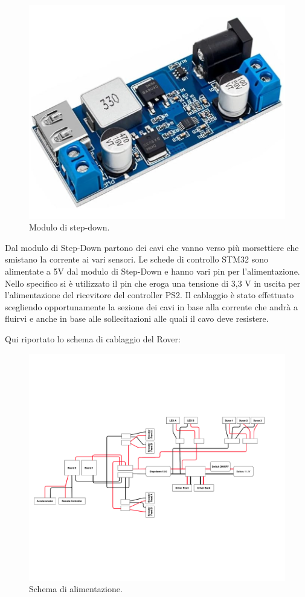 \documentclass{article}
\begin{document}
\begin{figure}[H]
\centering
\includegraphics[width=0.6\linewidth]{image/step-down.png}
\caption{\label{fig:step-down}Modulo di step-down.}
\end{figure}
Dal modulo di Step-Down partono dei cavi che vanno verso più morsettiere che smistano la corrente ai vari sensori.
Le schede di controllo STM32 sono alimentate a 5V dal modulo di Step-Down e hanno vari pin per l'alimentazione. Nello specifico si è utilizzato il pin che eroga una tensione di 3,3 V in uscita  per l'alimentazione del ricevitore del controller PS2.
Il cablaggio è stato effettuato scegliendo opportunamente la sezione dei cavi in base alla corrente che andrà a fluirvi e anche in base alle sollecitazioni alle quali il cavo deve resistere.
\newpage

Qui riportato lo schema di cablaggio del Rover:

\begin{figure}[H]
\centering
\includegraphics[width=1\linewidth]{image/alimentazione.png}
\caption{\label{fig:alimentazione}Schema di alimentazione.}
\end{figure}
\newpage
\end{document}
